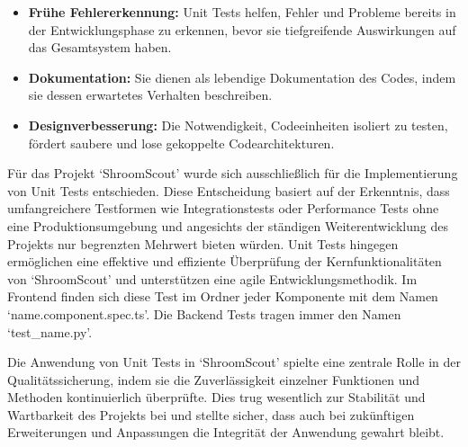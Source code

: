 \documentclass[../main.tex]{subfiles}
\begin{document}
\begin{itemize}

	\item \textbf{Frühe Fehlererkennung:}
	      Unit Tests helfen, Fehler und Probleme bereits in der Entwicklungsphase zu erkennen, bevor sie tiefgreifende Auswirkungen auf das Gesamtsystem haben.

	\item \textbf{Dokumentation:}
	      Sie dienen als lebendige Dokumentation des Codes, indem sie dessen erwartetes Verhalten beschreiben.

	\item \textbf{Designverbesserung:}
	      Die Notwendigkeit, Codeeinheiten isoliert zu testen, fördert saubere und lose gekoppelte Codearchitekturen.

\end{itemize}

Für das Projekt `ShroomScout' wurde sich ausschließlich für die Implementierung von Unit Tests entschieden. Diese Entscheidung basiert auf der Erkenntnis,
dass umfangreichere Testformen wie Integrationstests oder Performance Tests ohne eine Produktionsumgebung und angesichts der ständigen Weiterentwicklung des
Projekts nur begrenzten Mehrwert bieten würden. Unit Tests hingegen er\-mög\-lich\-en eine effektive und effiziente Überprüfung der Kernfunktionalitäten von
`ShroomScout' und unterstützen eine agile Entwicklungsmethodik. Im Frontend finden sich diese Test im Ordner jeder Komponente mit dem Namen `name.component.spec.ts'.
Die Backend Tests tragen immer den Namen `test_name.py'.

Die Anwendung von Unit Tests in `ShroomScout' spielte eine zentrale Rolle in der Qua\-li\-täts\-sich\-e\-rung, indem sie die Zuverlässigkeit einzelner
Funktionen und Methoden kontinuierlich überprüfte. Dies trug wesentlich zur Stabilität und Wartbarkeit des Projekts bei und stellte sicher, dass auch bei
zukünftigen Erweiterungen und Anpassungen die Integrität der Anwendung gewahrt bleibt.
\end{document}

